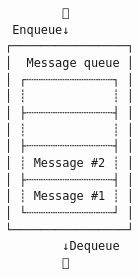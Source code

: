 \documentclass[varwidth,crop]{standalone}
\begin{document}
\begin{verbatim}
        
 Enqueue↓
┌────────────────┐
│  Message queue │
│ ┌┄┄┄┄┄┄┄┄┄┄┄┄┐ │
│ ┊            ┊ │
│ ├┄┄┄┄┄┄┄┄┄┄┄┄┤ │
│ ┊            ┊ │
│ ├┄┄┄┄┄┄┄┄┄┄┄┄┤ │
│ ┊ Message #2 ┊ │
│ ├┄┄┄┄┄┄┄┄┄┄┄┄┤ │
│ ┊ Message #1 ┊ │
│ └┄┄┄┄┄┄┄┄┄┄┄┄┘ │
└────────────────┘
        ↓Dequeue
        
\end{verbatim}
\end{document}
